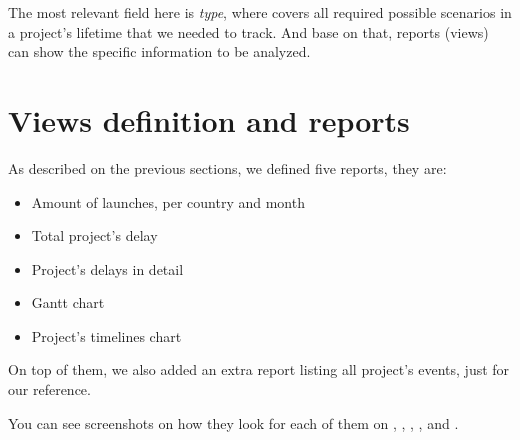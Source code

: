 The most relevant field here is \emph{type}, where covers all required possible
scenarios in a project's lifetime that we needed to track. And base on that, 
reports (views) can show the specific information to be analyzed.

\section{Views definition and reports}
As described on the previous sections, we defined five reports, they are:

\begin{itemize}
  \item Amount of launches, per country and month
  \item Total project's delay
  \item Project's delays in detail
  \item Gantt chart
  \item Project's timelines chart 
\end{itemize}

On top of them, we also added an extra report listing all project's events,
just for our reference.

You can see screenshots on how they look for each of them on
, ,
, ,
 and .

